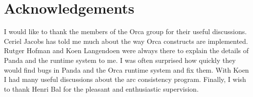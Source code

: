 \documentclass[a4paper,11pt]{article}
\begin{document}
\section{Acknowledgements}
I would like to thank the members of the Orca group for their useful
discussions. Ceriel Jacobs has told me much about the way Orca constructs
are implemented. Rutger Hofman and Koen Langendoen were always there
to explain the details of Panda and the runtime system to me.
I was often surprised how quickly they would find bugs in
Panda and the Orca runtime system and fix them.
With Koen I had many useful discussions about the arc consistency
program.
Finally, I wish to thank Henri Bal for the pleasant and enthusiastic
supervision.



\end{document}
